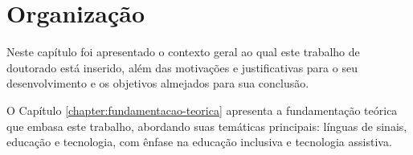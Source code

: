 



\section{Organização}

Neste capítulo foi apresentado o contexto geral ao qual este trabalho de doutorado está inserido, além das motivações e justificativas para o seu desenvolvimento e os objetivos almejados para sua conclusão. 

O Capítulo \ref{chapter:fundamentacao-teorica} apresenta a fundamentação teórica que embasa este trabalho, abordando suas temáticas principais: línguas de sinais, educação e tecnologia, com ênfase na educação inclusiva e tecnologia assistiva.

